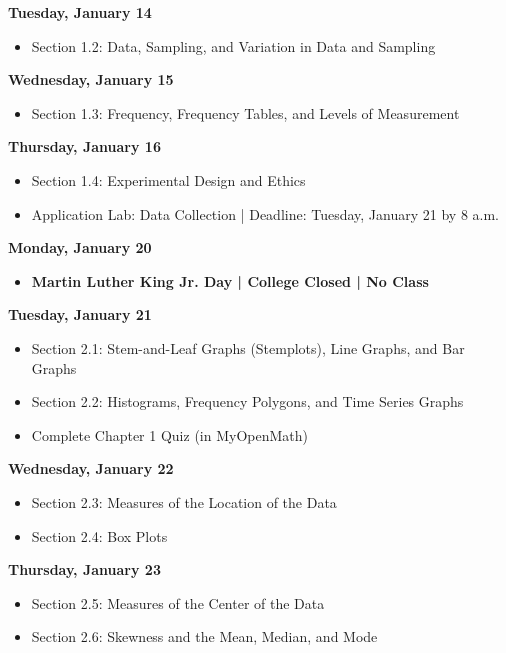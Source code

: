 \documentclass[11pt]{article}
\begin{document}
\textbf{Tuesday, January 14}

\begin{itemize}
\item Section 1.2: Data, Sampling, and Variation in Data and Sampling
\end{itemize}

\textbf{Wednesday, January 15}

\begin{itemize}
\item Section 1.3: Frequency, Frequency Tables, and Levels of Measurement
\end{itemize}

\textbf{Thursday, January 16}

\begin{itemize}
\item Section 1.4: Experimental Design and Ethics
\item Application Lab: Data Collection | Deadline: Tuesday, January 21 by 8 a.m.
\end{itemize}

\textbf{Monday, January 20}

\begin{itemize}
\item \textbf{Martin Luther King Jr. Day | College Closed | No Class}
\end{itemize}

\textbf{Tuesday, January 21}

\begin{itemize}
\item Section 2.1: Stem-and-Leaf Graphs (Stemplots), Line Graphs, and Bar Graphs
\item Section 2.2: Histograms, Frequency Polygons, and Time Series Graphs
\item Complete Chapter 1 Quiz (in MyOpenMath)
\end{itemize}

\textbf{Wednesday, January 22}

\begin{itemize}
\item Section 2.3: Measures of the Location of the Data
\item Section 2.4: Box Plots
\end{itemize}

\textbf{Thursday, January 23}

\begin{itemize}
\item Section 2.5: Measures of the Center of the Data
\item Section 2.6: Skewness and the Mean, Median, and Mode
\end{itemize}
\end{document}
